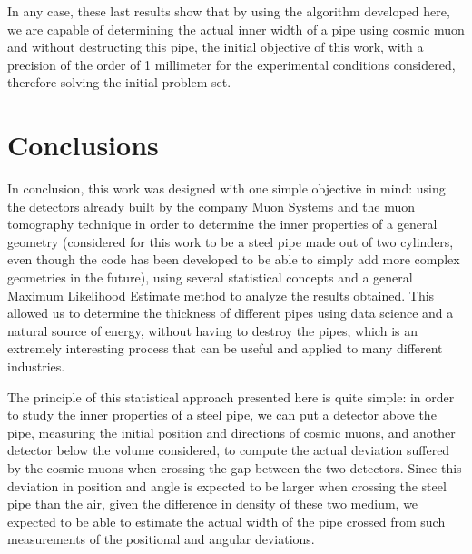 \documentclass[a4paper, 11pt, twoside, openright]{report}
\begin{document}
In any case, these last results show that by using the algorithm developed here, we are capable of determining the actual inner width of a pipe using cosmic muon and without destructing this pipe, the initial objective of this work, with a precision of the order of 1 millimeter for the experimental conditions considered, therefore solving the initial problem set.























\chapter{Conclusions}

In conclusion, this work was designed with one simple objective in mind: using the detectors already built by the company Muon Systems and the muon tomography technique in order to determine the inner properties of a general geometry (considered for this work to be a steel pipe made out of two cylinders, even though the code has been developed to be able to simply add more complex geometries in the future), using several statistical concepts and a general Maximum Likelihood Estimate method to analyze the results obtained. This allowed us to determine the thickness of different pipes using data science and a natural source of energy, without having to destroy the pipes, which is an extremely interesting process that can be useful and applied to many different industries.

The principle of this statistical approach presented here is quite simple: in order to study the inner properties of a steel pipe, we can put a detector above the pipe, measuring the initial position and directions of cosmic muons, and another detector below the volume considered, to compute the actual deviation suffered by the cosmic muons when crossing the gap between the two detectors. Since this deviation in position and angle is expected to be larger when crossing the steel pipe than the air, given the difference in density of these two medium, we expected to be able to estimate the actual width of the pipe crossed from such measurements of the positional and angular deviations. 
\end{document}
